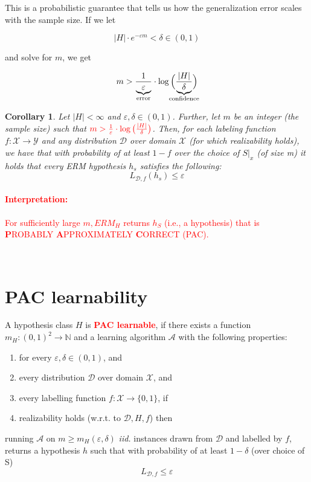 \documentclass[10pt,a4paper]{article}
\newtheorem{corollary}[theorem]{Corollary}
\theoremstyle{remark}
\theoremstyle{definition}
\theoremstyle{plain}
\begin{document}
This is a probabilistic guarantee that tells us how the generalization error scales with the sample size. If we let 

	$$ |H| \cdot e^{-\varepsilon m} <\delta \in (0,1)$$ 

and solve for $m$, we get 

	$$ m > \frac{1}{ \underbrace{ \varepsilon}_{\mathclap{\text{error}}}} \cdot \log \Big(\frac{|H|} {\underbrace{\delta}_{\mathclap{\text{confidence}} }}\Big)$$
	
\begin{corollary}
	Let $|H| < \infty$ and $\varepsilon, \delta \in (0,1)$. Further, let $m$ be an integer (the sample size) such that $\color{red} m>\frac{1}{\varepsilon} \cdot \log\big(\frac{|H|}{\delta}\big)$. Then, for each labeling function $f: \mathcal{X} \to \mathcal{Y}$ and any distribution $\mathcal{D}$ over domain $\mathcal{X}$ (for which realizability holds), we have that with probability of at least $1-f$ over the choice of $S|_x$ (of size m) it holds that every ERM hypothesis $h_s$ satisfies the following:
	$$ L_{\mathcal{D},f}(h_s) \leq \varepsilon $$
\end{corollary}

\textcolor{red}{\paragraph{Interpretation:} For sufficiently large $m, ERM_H$ returns $h_S$ (i.e., a hypothesis) that is \textbf{P}ROBABLY \textbf{A}PPROXIMATELY \textbf{C}ORRECT (PAC).}\\

\section{PAC learnability}

\begin{boxeddef}
	A hypothesis class $H$ is \textcolor{red}{\textbf{PAC learnable}}, if there exists a function $m_H: (0,1)^2 \to \mathbb{N}$ and a learning algorithm $\mathcal{A}$ with the following properties:
	\begin{enumerate}
		\item for every $\varepsilon, \delta \in (0,1)$, and
		\item every distribution $\mathcal{D}$ over domain $\mathcal{X}$, and
		\item every labelling function $f: \mathcal{X} \to \{0, 1\}$, if
		\item realizability holds (w.r.t. to $\mathcal{D}, H, f$) then
	\end{enumerate}
	running $\mathcal{A}$ on $m \geq m_H(\varepsilon, \delta)$ \textit{iid.} instances drawn from $\mathcal{D}$ and labelled by $f$, returns a hypothesis $h$ such that with probability of at least $1-\delta$ (over choice of S) 
	$$ L_{\mathcal{D}, f} \leq \varepsilon $$
\end{boxeddef}
\end{document}

